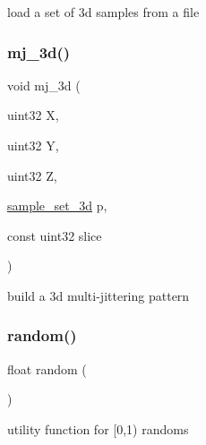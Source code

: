 load a set of 3d samples from a file \mbox{\label{group___sampling_ga74a2d233874c14c777b4a1f7de6dcad7}} 
\subsubsection{\texorpdfstring{mj\+\_\+3d()}{mj\_3d()}}
{\footnotesize\ttfamily void mj\+\_\+3d (\begin{DoxyParamCaption}\item[{uint32}]{X,  }\item[{uint32}]{Y,  }\item[{uint32}]{Z,  }\item[{\hyperlink{structsample__set__3d}{sample\+\_\+set\+\_\+3d}}]{p,  }\item[{const uint32}]{slice }\end{DoxyParamCaption})\hspace{0.3cm}{\ttfamily [inline]}}

build a 3d multi-\/jittering pattern \mbox{\label{group___sampling_gaec17bbbfd36295353081b7b4480d933d}} 
\subsubsection{\texorpdfstring{random()}{random()}}
{\footnotesize\ttfamily float random (\begin{DoxyParamCaption}{ }\end{DoxyParamCaption})\hspace{0.3cm}{\ttfamily [inline]}}

utility function for \mbox{[}0,1) randoms 